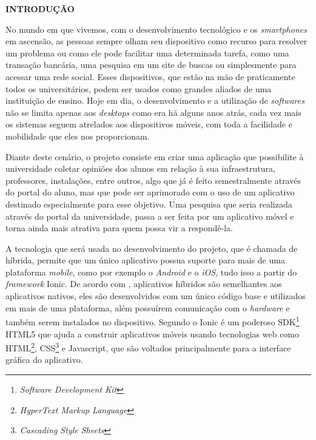 \vspace{1.2em}
\textbf{\large INTRODUÇÃO}

\vspace{2.9em}


	\par No mundo em que vivemos, com o desenvolvimento tecnológico e os \textit{smartphones} em ascensão, as pessoas sempre olham seu dispositivo como recurso para resolver um problema ou como ele pode facilitar uma determinada tarefa, como uma transação bancária, uma pesquisa em um site de buscas ou simplesmente para acessar uma rede social. Esses dispositivos, que estão na mão de praticamente todos os universitários, podem ser usados como grandes aliados de uma instituição de ensino. Hoje em dia, o desenvolvimento e a utilização de \textit{softwares} não se limita apenas aos \textit{desktops} como era há alguns anos atrás, cada vez mais os sistemas seguem atrelados aos dispositivos móveis, com toda a facilidade e mobilidade que eles nos proporcionam.
	
	\par Diante deste cenário, o projeto consiste em criar uma aplicação que possibilite à universidade coletar opiniões dos alunos em relação à sua infraestrutura, professores, instalações, entre outros, algo que já é feito semestralmente através do portal do aluno, mas que pode ser aprimorado com o uso de um aplicativo destinado especialmente para esse objetivo. Uma pesquisa que seria realizada através do portal da universidade, passa a ser feita por um aplicativo móvel e torna ainda mais atrativa para quem possa vir a respondê-la. 

	\par A tecnologia que será usada no desenvolvimento do projeto, que é chamada de híbrida, permite que um único aplicativo possua suporte para mais de uma plataforma \textit{mobile}, como por exemplo o \textit{Android} e o \textit{iOS}, tudo isso a partir do \textit{framework} Ionic. De acordo com , aplicativos híbridos são semelhantes aos aplicativos nativos, eles são desenvolvidos com um único código base e utilizados em mais de uma plataforma, além possuírem comunicação com o \textit{hardware} e também serem instalados no dispositivo. Segundo  o Ionic é um poderoso SDK\footnote{\textit{Software Development Kit}} HTML5 que ajuda a construir aplicativos móveis usando tecnologias web como HTML\footnote{\textit{HyperText Markup Language}}, CSS\footnote{\textit{Cascading Style Sheets}} e Javascript, que são voltados principalmente para a interface gráfica do aplicativo.

